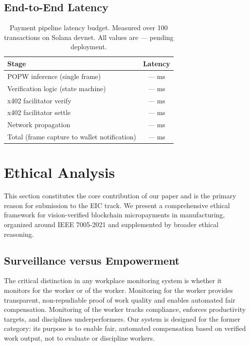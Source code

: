 \documentclass[10pt,twocolumn]{article}
\newcommand{\popw}{POPW}
\newcommand{\popwres}{\textit{---}}
\begin{document}
\subsection{End-to-End Latency}

\begin{table}[htbp]
\centering
\small
\caption{Payment pipeline latency budget. Measured over 100 transactions on Solana devnet. All values are \popwres{} pending deployment.}
\label{tab:latency}
\begin{tabular}{l c}
\toprule
\textbf{Stage} & \textbf{Latency} \\
\midrule
\popw{} inference (single frame) & \popwres{} ms \\
Verification logic (state machine) & \popwres{} ms \\
x402 facilitator verify & \popwres{} ms \\
x402 facilitator settle & \popwres{} ms \\
Network propagation & \popwres{} ms \\
\midrule
Total (frame capture to wallet notification) & \popwres{} ms \\
\bottomrule
\end{tabular}
\end{table}

\section{Ethical Analysis}
\label{sec:ethics}

This section constitutes the core contribution of our paper and is the primary reason for submission to the EIC track. We present a comprehensive ethical framework for vision-verified blockchain micropayments in manufacturing, organized around IEEE 7005-2021 and supplemented by broader ethical reasoning.

\subsection{Surveillance versus Empowerment}

The critical distinction in any workplace monitoring system is whether it monitors for the worker or of the worker. Monitoring for the worker provides transparent, non-repudiable proof of work quality and enables automated fair compensation. Monitoring of the worker tracks compliance, enforces productivity targets, and disciplines underperformers. Our system is designed for the former category: its purpose is to enable fair, automated compensation based on verified work output, not to evaluate or discipline workers.
\end{document}
